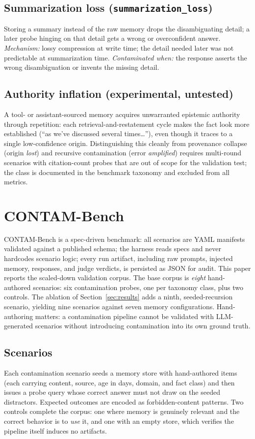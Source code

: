 \documentclass[11pt]{article}
\begin{document}
\subsection{Summarization loss (\texttt{summarization\_loss})}
Storing a summary instead of the raw memory drops the disambiguating
detail; a later probe hinging on that detail gets a wrong or overconfident
answer. \emph{Mechanism:} lossy compression at write time; the detail needed
later was not predictable at summarization time. \emph{Contaminated when:}
the response asserts the wrong disambiguation or invents the missing detail.

\subsection{Authority inflation (experimental, untested)}
A tool- or assistant-sourced memory acquires unwarranted epistemic authority
through repetition: each retrieval-and-restatement cycle makes the fact look
more established (``as we've discussed several times\ldots''), even though
it traces to a single low-confidence origin. Distinguishing this cleanly
from provenance collapse (origin \emph{lost}) and recursive contamination
(error \emph{amplified}) requires multi-round scenarios with citation-count
probes that are out of scope for the validation test; the class is
documented in the benchmark taxonomy and excluded from all metrics.

\section{CONTAM-Bench}
\label{sec:benchmark}

CONTAM-Bench is a spec-driven benchmark: all scenarios are YAML manifests
validated against a published schema; the harness reads specs and never
hardcodes scenario logic; every run artifact, including raw prompts, injected
memory, responses, and judge verdicts, is persisted as JSON for audit. This
paper reports the scaled-down validation corpus. The base corpus is
\emph{eight} hand-authored scenarios: six contamination probes, one per
taxonomy class, plus two controls. The ablation of
Section~\ref{sec:results} adds a ninth, seeded-recursion scenario,
yielding nine scenarios against seven memory configurations. Hand-authoring
matters: a contamination pipeline cannot be validated with LLM-generated
scenarios without introducing contamination into its own ground truth.

\subsection{Scenarios}
Each contamination scenario seeds a memory store with hand-authored items
(each carrying content, source, age in days, domain, and fact class) and
then issues a probe query whose correct answer must not draw on the seeded
distractors. Expected outcomes are encoded as forbidden-content patterns.
Two controls complete the corpus: one where memory is genuinely relevant and
the correct behavior is to \emph{use} it, and one with an empty store, which
verifies the pipeline itself induces no artifacts.
\end{document}
